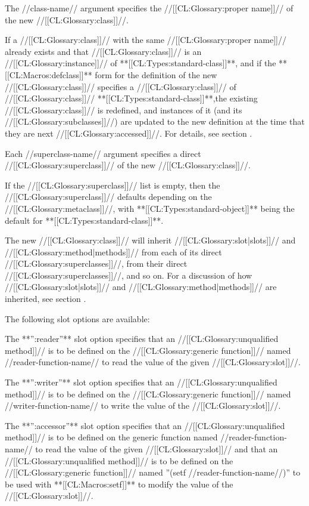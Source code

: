 The //class-name// argument specifies the //[[CL:Glossary:proper name]]// of the new //[[CL:Glossary:class]]//.

If a //[[CL:Glossary:class]]// with the same //[[CL:Glossary:proper name]]// already exists and that //[[CL:Glossary:class]]// is an //[[CL:Glossary:instance]]// of **[[CL:Types:standard-class]]**, and if the **[[CL:Macros:defclass]]** form for the definition of the new //[[CL:Glossary:class]]// specifies a //[[CL:Glossary:class]]// of //[[CL:Glossary:class]]// **[[CL:Types:standard-class]]**,the existing //[[CL:Glossary:class]]// is redefined, and instances of it (and its //[[CL:Glossary:subclasses]]//) are updated to the new definition at the time that they are next //[[CL:Glossary:accessed]]//. For details, see section {\secref\ClassReDef}.

Each //superclass-name// argument specifies a direct //[[CL:Glossary:superclass]]// of the new //[[CL:Glossary:class]]//.

If the //[[CL:Glossary:superclass]]// list is empty, then the //[[CL:Glossary:superclass]]// defaults depending on the //[[CL:Glossary:metaclass]]//, with **[[CL:Types:standard-object]]** being the default for **[[CL:Types:standard-class]]**.

The new //[[CL:Glossary:class]]// will inherit //[[CL:Glossary:slot|slots]]// and //[[CL:Glossary:method|methods]]// from each of its direct //[[CL:Glossary:superclasses]]//, from their direct //[[CL:Glossary:superclasses]]//, and so on. For a discussion of how //[[CL:Glossary:slot|slots]]// and //[[CL:Glossary:method|methods]]// are inherited, see section {\secref\Inheritance}.

The following slot options are available:

\beginlist

\itemitem{\bull} The **'':reader''** slot option specifies that an //[[CL:Glossary:unqualified method]]// is to be defined on the //[[CL:Glossary:generic function]]// named //reader-function-name// to read the value of the given //[[CL:Glossary:slot]]//.

\itemitem{\bull} The **'':writer''** slot option specifies that an //[[CL:Glossary:unqualified method]]// is to be defined on the //[[CL:Glossary:generic function]]// named //writer-function-name// to write the value of the //[[CL:Glossary:slot]]//.

\itemitem{\bull} The **'':accessor''** slot option specifies that an //[[CL:Glossary:unqualified method]]// is to be defined on the generic function named //reader-function-name// to read the value of the given //[[CL:Glossary:slot]]// and that an //[[CL:Glossary:unqualified method]]// is to be defined on the //[[CL:Glossary:generic function]]// named ''(setf //reader-function-name//)'' to be used with **[[CL:Macros:setf]]** to modify the value of the //[[CL:Glossary:slot]]//.

